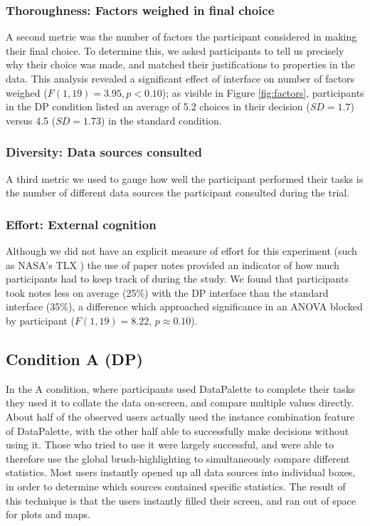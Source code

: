 \documentclass{sigchi}
\begin{document}
\subsubsection{Thoroughness: Factors weighed in final choice}
A second metric was the number of factors the participant considered in making their final choice. To determine this, we asked participants to tell us precisely why their choice was made, and matched their justifications to properties in the data.  This analysis revealed a significant effect of interface on number of factors weighed ($F(1,19)=3.95, p<0.10$); as visible in Figure \ref{fig:factors}, participants in the DP condition listed an average of 5.2 choices in their decision ($SD=1.7$) versus 4.5 ($SD=1.73$) in the standard condition.

\subsubsection{Diversity: Data sources consulted}
A third metric we used to gauge how well the participant performed their tasks is the number of different data sources the participant consulted during the trial.

\subsubsection{Effort: External cognition}
Although we did not have an explicit measure of effort for this experiment (such as NASA's TLX \cite{tlx}) the use of paper notes provided an indicator of how much participants had to keep track of during the study.  We found that participants took notes less on average (25\%) with the DP interface than the standard interface (35\%), a difference which approached significance in an ANOVA blocked by participant ($F(1,19)= 8.22$, $p\approx0.10$).

\subsection{Condition A (DP)}
In the A condition, where participants used DataPalette to complete their tasks they used it to collate the data on-screen, and compare multiple values directly. About half of the observed users actually used the instance combination feature of DataPalette, with the other half able to successfully make decisions without using it. Those who tried to use it were largely successful, and were able to therefore use the global brush-highlighting to simultaneously compare different statistics. Most users instantly opened up all data sources into individual boxes, in order to determine which sources contained specific statistics. The result of this technique is that the users instantly filled their screen, and ran out of space for plots and maps.
\end{document}
